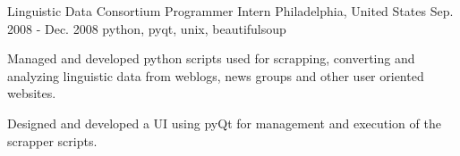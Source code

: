 \cventry
    {Linguistic Data Consortium} %
    {Programmer Intern} %
    {Philadelphia, United States} %
    {Sep. 2008 - Dec. 2008} %
    { python, pyqt, unix, beautifulsoup} %
    {
        \vspace{-4.0mm}
    \begin{cvitems} %
        \item { Managed and developed python scripts used for scrapping, converting and analyzing linguistic data from weblogs, news groups and other user oriented websites.}
        \item { Designed and developed a UI using pyQt for management and execution of the scrapper scripts.}
    \end{cvitems}
    }
